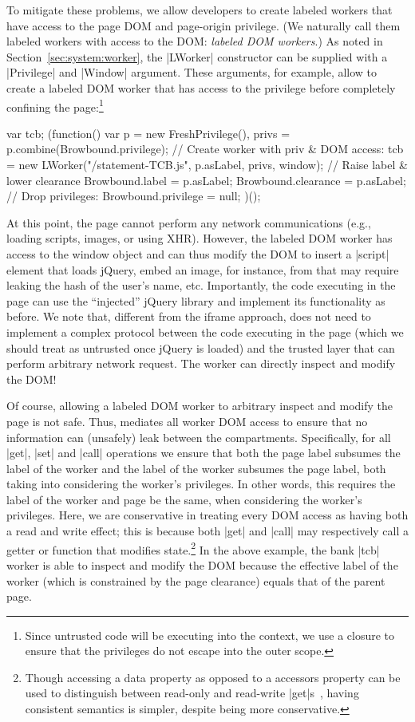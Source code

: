 To mitigate these problems, we allow developers to create labeled workers that
have access to the page DOM and page-origin privilege.
%
(We naturally call them labeled workers with access to the DOM:
\emph{labeled DOM workers}.)
%
As noted in Section~\ref{sec:system:worker}, the \js|LWorker|
constructor can be supplied with a \js|Privilege| and \js|Window|
argument.
%
These arguments, for example, allow  to create a labeled DOM
worker that has access to the  privilege before completely
confining the page:\footnote{
  Since untrusted code will be executing into the context, we use a
  closure to ensure that the privileges do not escape into the outer
  scope.
}
\begin{jscode}
var tcb;
(function() {
  var p = new FreshPrivilege(),
      privs = p.combine(Browbound.privilege);
  // Create worker with priv & DOM access:
  tcb = new LWorker("/statement-TCB.js",
                    p.asLabel, privs, window);
  // Raise label & lower clearance
  Browbound.label = p.asLabel;
  Browbound.clearance = p.asLabel;
  // Drop privileges:
  Browbound.privilege = null;
})();
\end{jscode}
%
At this point, the page cannot perform any network communications
(e.g., loading scripts, images, or using XHR).
%
However, the labeled DOM worker has access to the window object and
can thus modify the DOM to insert a \js|script| element that loads
jQuery, embed an image, for instance, from  that
may require leaking the hash of the user's name, etc.
%
Importantly, the code executing in the page can use the ``injected''
jQuery library and implement its functionality as before.
%
We note that, different from the iframe approach,  does not 
need to implement a complex protocol between the code executing in the
page (which we should treat as untrusted once jQuery is loaded) and
the trusted layer that can perform arbitrary network request.
%
The worker can directly inspect and modify the DOM!

Of course, allowing a labeled DOM worker to arbitrary inspect and
modify the page is not safe.
%
Thus, \sys{} mediates all worker DOM access to ensure that no information can
(unsafely) leak between the compartments.
%
Specifically, for all \js|get|, \js|set| and \js|call| operations we
ensure that both the page label subsumes the label of the worker 
and the label of the worker subsumes the page label,
both taking into considering the worker's privileges.
%
In other words, this requires the label of the worker and page be the same,
when considering the worker's privileges.
%
Here, we are conservative in treating every DOM access as
having both a read and write effect;
%
this is because both \js|get| and \js|call| may respectively call a getter or
function that modifies state.\footnote{
Though accessing a data property as opposed to a accessors property
can be used to distinguish between read-only and read-write
\js|get|s~, having consistent semantics is simpler,
despite being more conservative.
}
%
In the above example, the bank \js|tcb| worker is able to inspect and modify
the DOM because the effective label of the worker (which is constrained by the
page clearance) equals that of the parent page.
%



